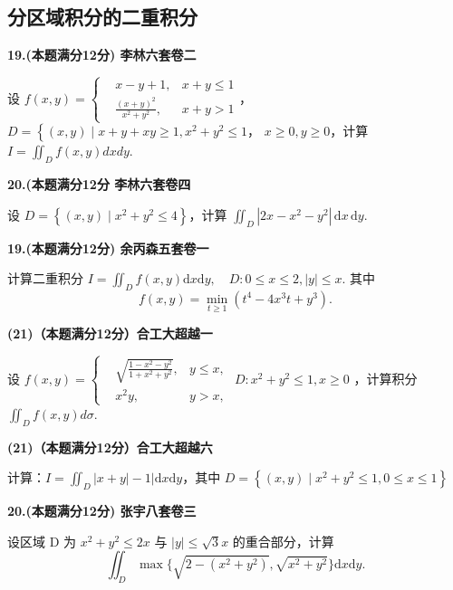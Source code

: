 \documentclass[a4paper,12pt]{article}
\begin{document}
\subsection{分区域积分的二重积分}

\textbf{19.(本题满分12分) 李林六套卷二}

设 $f(x,y)=\left\{\begin{aligned}&x-y+1,&x+y\leqslant1\\ &\frac{(x+y)^{2}}{x^{2}+y^{2}},&x+y>1\end{aligned}\right.$， $D=\left\{(x,y)\mid x+y+xy\geqslant1,x^{2}+y^{2}\leqslant1\right.$， $x\geqslant0,y\geqslant0$，计算 $I=\iint_{D}f(x,y)dxdy.$

\vspace{0.5cm}

\textbf{20.(本题满分12分 李林六套卷四}

设 $D=\left\{(x,y)\mid x^{2}+y^{2}\leqslant4\right\}$，计算 $\iint_{D}|2x-x^{2}-y^{2}|\,\mathrm{d}x\,\mathrm{d}y.$

\vspace{0.5cm}

\textbf{19.(本题满分12分) 余丙森五套卷一}

计算二重积分 $I=\iint_{D}f(x,y)\mathrm{d}x\mathrm{d}y,\quad D:0\leqslant x\leqslant2,\left|y\right|\leqslant x.$ 其中
\[ f(x,y)=\min_{t\geqslant1}(t^{4}-4x^{3}t+y^{3}). \]

\vspace{0.5cm}

\textbf{(21)（本题满分12分）合工大超越一}

设 $f(x,y)=\left\{\begin{aligned}&\sqrt{\frac{1-x^{2}-y^{2}}{1+x^{2}+y^{2}}},&y\leqslant x,\\&x^{2}y,&y>x,\end{aligned}\right.$ $D:x^{2}+y^{2}\leqslant1,x\geqslant0$ ，计算积分 $\iint_{D}f(x,y)d\sigma.$

\vspace{0.5cm}

\textbf{(21)（本题满分12分）合工大超越六}

计算：$I=\iint_{D}\left|x+y\right|-1\left|\mathrm{d}x\mathrm{d}y\right.$，其中 $D=\left\{(x,y)\mid x^{2}+y^{2}\leqslant1,0\leqslant x\leqslant1\right\}$

\vspace{0.5cm}

\textbf{20.(本题满分12分) 张宇八套卷三}

设区域 D 为 $x^{2} + y^{2} \leqslant 2x$ 与 $|y| \leqslant \sqrt{3}x$ 的重合部分，计算
\[ \iint_{D}\max\{\sqrt{2-(x^{2}+y^{2})},\sqrt{x^{2}+y^{2}}\}\mathrm{d}x\mathrm{d}y. \]
\end{document}
